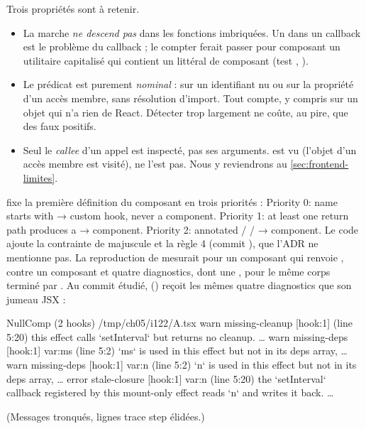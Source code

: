 

Trois propriétés sont à retenir.
\begin{itemize}
  \item La marche \emph{ne descend pas} dans les fonctions imbriquées. Un  dans un callback est le problème du callback ; le compter ferait passer pour composant un utilitaire capitalisé qui contient un littéral de composant (test , ).
  \item Le prédicat est purement \emph{nominal} :  sur un identifiant nu ou sur la propriété d'un accès membre, sans résolution d'import. Tout  compte, y compris sur un objet qui n'a rien de React. Détecter trop largement ne coûte, au pire, que des faux positifs.
  \item Seul le \emph{callee} d'un appel est inspecté, pas ses arguments.  est vu (l'objet d'un accès membre est visité),  ne l'est pas. Nous y reviendrons au \cref{sec:frontend-limites}.
\end{itemize}

\begin{decision}
 fixe la première définition du composant en trois priorités : \og Priority 0: name starts with  → custom hook, never a component. Priority 1: at least one return path produces a  → component. Priority 2: annotated  /  /  → component.\fg{} Le code ajoute la contrainte de majuscule et la règle 4 (commit ), que l'ADR ne mentionne pas. La reproduction de  mesurait  pour un composant  qui renvoie , contre un composant et quatre diagnostics, dont une \Error{} , pour le même corps terminé par . Au commit étudié,  () reçoit les mêmes quatre diagnostics que son jumeau JSX :
\begin{sortie}
  NullComp  (2 hooks)  /tmp/ch05/i122/A.tsx
    warn   missing-cleanup  [hook:1]  (line 5:20)  this effect calls `setInterval` but returns no cleanup. …
    warn   missing-deps  [hook:1]  var:ms  (line 5:2)  `ms` is used in this effect but not in its deps array, …
    warn   missing-deps  [hook:1]  var:n  (line 5:2)  `n` is used in this effect but not in its deps array, …
    error  stale-closure  [hook:1]  var:n  (line 5:20)  the `setInterval` callback registered by this mount-only effect reads `n` and writes it back. …
\end{sortie}
(Messages tronqués, lignes \og trace step\fg{} élidées.)
\end{decision}

